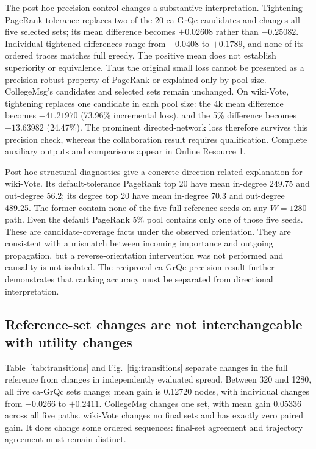 \documentclass[smallextended]{svjour3}
\begin{document}
The post-hoc precision control changes a substantive interpretation. Tightening PageRank tolerance replaces two of the 20 ca-GrQc candidates and changes all five selected sets; its mean difference becomes $+0.02608$ rather than $-0.25082$. Individual tightened differences range from $-0.0408$ to $+0.1789$, and none of its ordered traces matches full greedy. The positive mean does not establish superiority or equivalence. Thus the original small loss cannot be presented as a precision-robust property of PageRank or explained only by pool size. CollegeMsg's candidates and selected sets remain unchanged. On wiki-Vote, tightening replaces one candidate in each pool size: the 4k mean difference becomes $-41.21970$ (73.96\% incremental loss), and the 5\% difference becomes $-13.63982$ (24.47\%). The prominent directed-network loss therefore survives this precision check, whereas the collaboration result requires qualification. Complete auxiliary outputs and comparisons appear in Online Resource 1.

Post-hoc structural diagnostics give a concrete direction-related explanation for wiki-Vote. Its default-tolerance PageRank top 20 have mean in-degree 249.75 and out-degree 56.2; its degree top 20 have mean in-degree 70.3 and out-degree 489.25. The former contain none of the five full-reference seeds on any $W=1280$ path. Even the default PageRank 5\% pool contains only one of those five seeds. These are candidate-coverage facts under the observed orientation. They are consistent with a mismatch between incoming importance and outgoing propagation, but a reverse-orientation intervention was not performed and causality is not isolated. The reciprocal ca-GrQc precision result further demonstrates that ranking accuracy must be separated from directional interpretation.

\subsection{Reference-set changes are not interchangeable with utility changes}
Table~\ref{tab:transitions} and Fig.~\ref{fig:transitions} separate changes in the full reference from changes in independently evaluated spread. Between 320 and 1280, all five ca-GrQc sets change; mean gain is 0.12720 nodes, with individual changes from $-0.0266$ to $+0.2411$. CollegeMsg changes one set, with mean gain 0.05336 across all five paths. wiki-Vote changes no final sets and has exactly zero paired gain. It does change some ordered sequences: final-set agreement and trajectory agreement must remain distinct.

\end{document}
